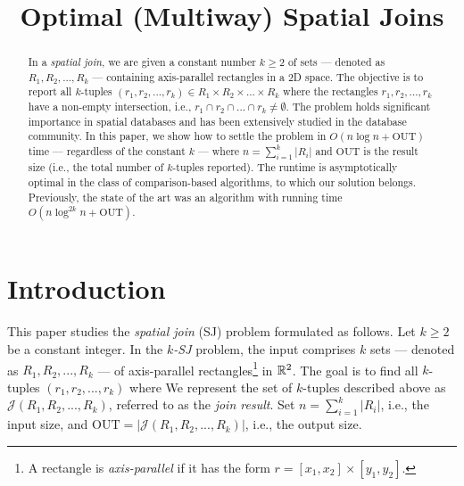 \documentclass[acmsmall,review,anonymous]{acmart}
\def\J{\mathcal{J}}
\def\out{\mathrm{OUT}}
\begin{document}
    
\title{Optimal (Multiway) Spatial Joins}


\author{}


\begin{abstract}
    In a {\em spatial join}, we are given a constant number $k \geq 2$ of sets --- denoted as $R_1, R_2, ..., R_k$ --- containing axis-parallel rectangles in a 2D space. The objective is to report all $k$-tuples $(r_1, r_2, ..., r_k) \in R_1 \times R_2 \times ... \times R_k$ where the rectangles $r_1, r_2, ..., r_k$ have a non-empty intersection, i.e., $r_1 \cap r_2 \cap ... \cap r_k \neq \emptyset$. The problem holds significant importance in spatial databases and has been extensively studied in the database community. In this paper, we show how to settle the problem in $O(n \log n + \out)$ time --- regardless of the constant $k$ --- where $n = \sum_{i=1}^k |R_i|$ and $\out$ is the result size (i.e., the total number of $k$-tuples reported). The runtime  is asymptotically optimal in the class of comparison-based algorithms, to which our solution belongs. Previously, the state of the art was an algorithm with running time $O(n \log^{2k} n + \out)$.
\end{abstract}

\maketitle 

\section{Introduction} \label{sec:intro}

This paper studies the {\em spatial join} (SJ) problem formulated as follows. Let $k \ge 2$ be a constant integer. In the {\em $k$-SJ} problem, the input comprises $k$ sets --- denoted as $R_1, R_2, ..., R_k$ --- of axis-parallel rectangles\footnote{A rectangle is {\em axis-parallel} if it has the form $r = [x_1, x_2] \times [y_1, y_2]$.} in $\mathbb{R}^2$. The goal is to find all $k$-tuples $(r_1, r_2, ..., r_k)$ where
We represent the set of $k$-tuples described above as $\J(R_1, R_2, ..., R_k)$, referred to as the {\em join result}. Set $n = \sum_{i=1}^k |R_i|$, i.e., the input size, and $\out = |\J(R_1, R_2, ..., R_k)|$, i.e., the output size.
\end{document}
